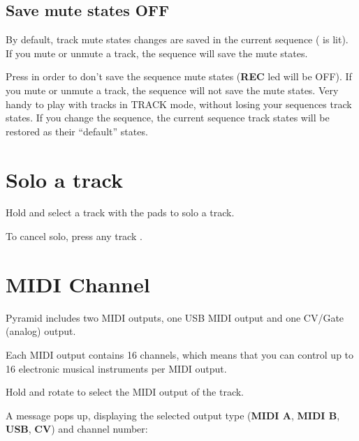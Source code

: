 \subsection{Save mute states OFF}

By default, track mute states changes are saved in the current sequence ( is lit). If you mute or unmute a track, the sequence will save the mute states.


Press  in order to don't save the sequence mute states (\textbf{REC} led will be OFF). If you mute or unmute a track, the sequence will not save the mute states. Very handy to play with tracks in TRACK mode, without losing your sequences track states. If you change the sequence, the current sequence track states will be restored as their ``default'' states.


\section{Solo a track}

Hold  and select a track with the pads \stepbystepicon{} to solo a track.

To cancel solo, press any track \stepbystepicon{}.


\section{MIDI Channel}

Pyramid includes two MIDI outputs, one USB MIDI output and one CV/Gate (analog) output.

Each MIDI output contains 16 channels, which means that you can control up to 16 electronic musical instruments per MIDI output.

Hold  and rotate \encodericon{} to select the MIDI output of the track.


A message pops up, displaying the selected output type (\textbf{MIDI A}, \textbf{MIDI B}, \textbf{USB}, \textbf{CV}) and channel number:



